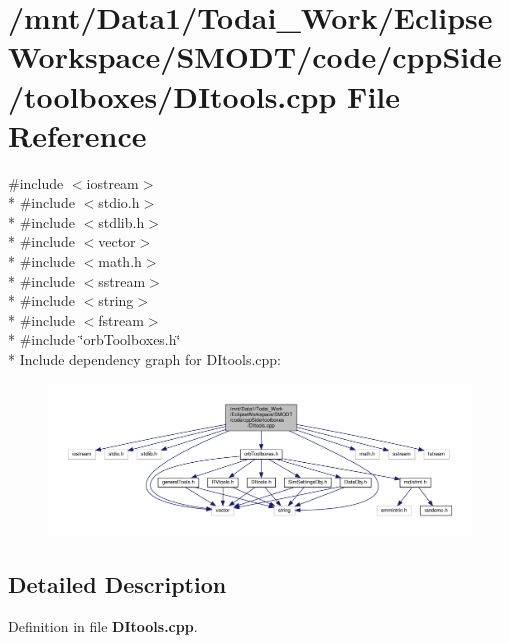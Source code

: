 \section{/mnt/\-Data1/\-Todai\-\_\-\-Work/\-Eclipse\-Workspace/\-S\-M\-O\-D\-T/code/cpp\-Side/toolboxes/\-D\-Itools.cpp File Reference}
\label{_d_itools_8cpp}
{\ttfamily \#include $<$iostream$>$}\\*
{\ttfamily \#include $<$stdio.\-h$>$}\\*
{\ttfamily \#include $<$stdlib.\-h$>$}\\*
{\ttfamily \#include $<$vector$>$}\\*
{\ttfamily \#include $<$math.\-h$>$}\\*
{\ttfamily \#include $<$sstream$>$}\\*
{\ttfamily \#include $<$string$>$}\\*
{\ttfamily \#include $<$fstream$>$}\\*
{\ttfamily \#include \char`\"{}orb\-Toolboxes.\-h\char`\"{}}\\*
Include dependency graph for D\-Itools.\-cpp\-:
\nopagebreak
\begin{figure}[H]
\begin{center}
\leavevmode
\includegraphics[width=350pt]{_d_itools_8cpp__incl}
\end{center}
\end{figure}


\subsection{Detailed Description}


Definition in file {\bf D\-Itools.\-cpp}.

